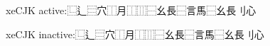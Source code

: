 \documentclass{article}
\newcommand\BiangIDS{⿺辶⿳穴⿰月⿰⿲⿱幺長⿱言馬⿱幺長刂心}
\begin{document}
\noindent
\Large
xeCJK active:\quad \BiangIDS

\medskip
\begingroup
  \makexeCJKinactive
  \SourceHanSerif
  xeCJK inactive:\quad \BiangIDS
\endgroup
\end{document}
